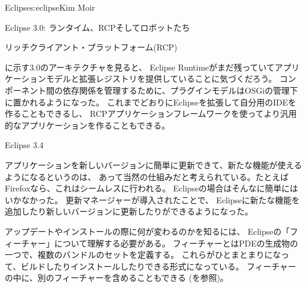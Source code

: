 \begin{aosachapter}{Eclipse}{s:eclipse}{Kim Moir}
\begin{aosasect1}{Eclipse 3.0: ランタイム、RCPそしてロボットたち}
\begin{aosasect2}{リッチクライアント・プラットフォーム(RCP)}

に示す3.0のアーキテクチャを見ると、
Eclipse Runtimeがまだ残っていてアプリケーションモデルと拡張レジストリを提供していることに気づくだろう。
コンポーネント間の依存関係を管理するために、プラグインモデルはOSGiの管理下に置かれるようになった。
これまでどおりにEclipseを拡張して自分用のIDEを作ることもできるし、
RCPアプリケーションフレームワークを使ってより汎用的なアプリケーションを作ることもできる。

\end{aosasect2}

\end{aosasect1}

\begin{aosasect1}{Eclipse 3.4}

アプリケーションを新しいバージョンに簡単に更新できて、新たな機能が使えるようになるというのは、
あって当然の仕組みだと考えられている。たとえばFirefoxなら、これはシームレスに行われる。
Eclipseの場合はそんなに簡単にはいかなかった。
更新マネージャーが導入されたことで、
Eclipseに新たな機能を追加したり新しいバージョンに更新したりができるようになった。

アップデートやインストールの際に何が変わるのかを知るには、
Eclipseの「フィーチャー」について理解する必要がある。
フィーチャーとはPDEの生成物の一つで、複数のバンドルのセットを定義する。
これらがひとまとまりになって、ビルドしたりインストールしたりできる形式になっている。
フィーチャーの中に、別のフィーチャーを含めることもできる
(を参照)。


\end{aosasect1}
\end{aosachapter}
